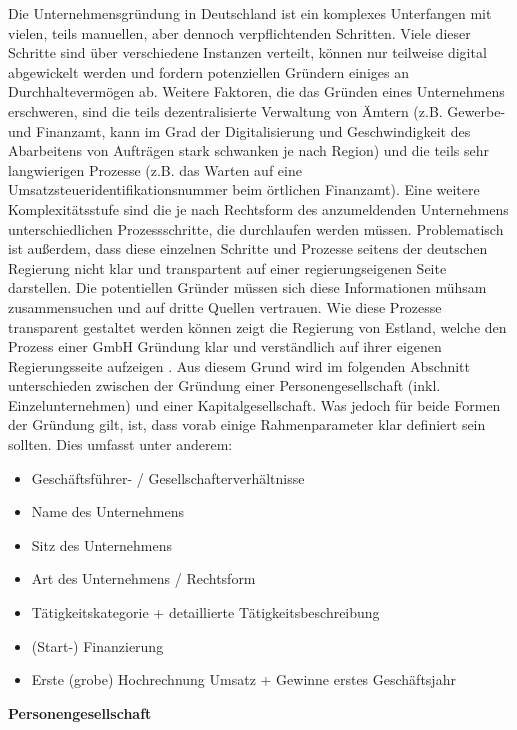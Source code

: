 Die Unternehmensgründung in Deutschland ist ein komplexes Unterfangen mit vielen, teils manuellen, aber dennoch verpflichtenden Schritten. Viele dieser Schritte sind über verschiedene Instanzen verteilt, können nur teilweise digital abgewickelt werden und fordern potenziellen Gründern einiges an Durchhaltevermögen ab. Weitere Faktoren, die das Gründen eines Unternehmens erschweren, sind die teils dezentralisierte Verwaltung von Ämtern (z.B. Gewerbe- und Finanzamt, kann im Grad der Digitalisierung und Geschwindigkeit des Abarbeitens von Aufträgen stark schwanken je nach Region) und die teils sehr langwierigen Prozesse (z.B. das Warten auf eine Umsatzsteueridentifikationsnummer beim örtlichen Finanzamt). Eine weitere Komplexitätsstufe sind die je nach Rechtsform des anzumeldenden Unternehmens unterschiedlichen Prozessschritte, die durchlaufen werden müssen. Problematisch ist außerdem, dass diese einzelnen Schritte und Prozesse seitens der deutschen Regierung nicht klar und transpartent auf einer regierungseigenen Seite darstellen. Die potentiellen Gründer müssen sich diese Informationen mühsam zusammensuchen und auf dritte Quellen vertrauen. Wie diese Prozesse transparent gestaltet werden können zeigt die Regierung von Estland, welche den Prozess einer GmbH Gründung klar und verständlich auf ihrer eigenen Regierungsseite aufzeigen .  Aus diesem Grund wird im folgenden Abschnitt unterschieden zwischen der Gründung einer Personengesellschaft (inkl. Einzelunternehmen) und einer Kapitalgesellschaft. Was jedoch für beide Formen der Gründung gilt, ist, dass vorab einige Rahmenparameter klar definiert sein sollten. Dies umfasst unter anderem: 

\begin{itemize}
    \item Geschäftsführer- / Gesellschafterverhältnisse
    \item Name des Unternehmens
    \item Sitz des Unternehmens
    \item Art des Unternehmens / Rechtsform
    \item Tätigkeitskategorie + detaillierte Tätigkeitsbeschreibung
    \item (Start-) Finanzierung
    \item Erste (grobe) Hochrechnung Umsatz + Gewinne erstes Geschäftsjahr
\end{itemize} 

\textbf{Personengesellschaft}

